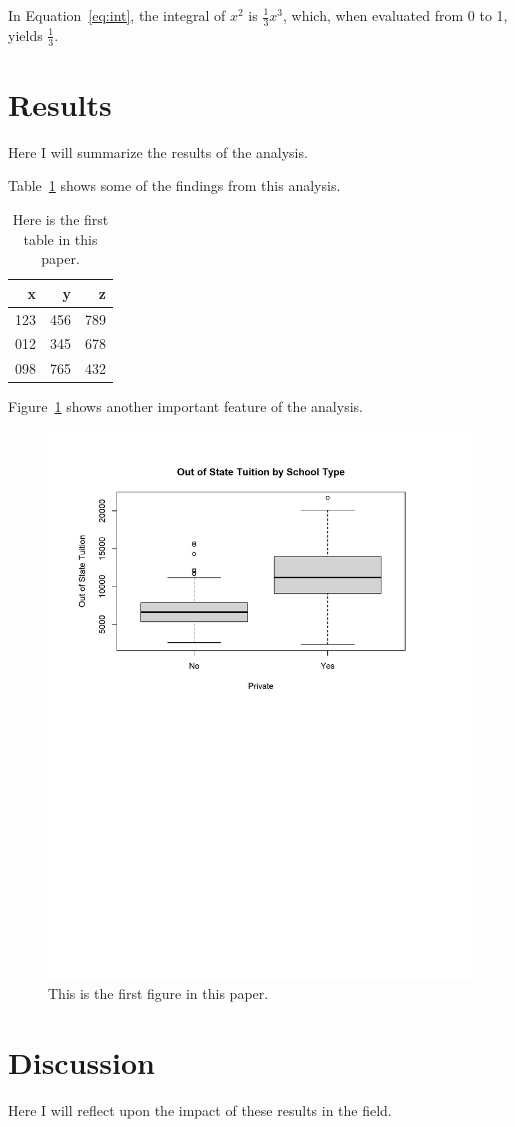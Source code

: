 \documentclass[12pt]{article}
\begin{document}
In Equation~\eqref{eq:int}, the integral of $x^2$ is $\frac{1}{3}x^3$, which, when evaluated from 0 to 1, yields $\frac{1}{3}$.

\section{Results}
\label{sec:resu}

Here I will summarize the results of the analysis.

\lipsum[3]

Table~\ref{tab:tabl} shows some of the findings from this analysis.

\begin{table}[tbp]
\caption{Here is the first table in this paper.}
\label{tab:tabl}
\centering
\begin{tabular}{rrr}
\toprule
x & y & z \\
\midrule
123 & 456 & 789 \\
012 & 345 & 678 \\
098 & 765 & 432 \\
\bottomrule
\end{tabular}
\end{table}

Figure~\ref{fig:figu} shows another important feature of the analysis.

\begin{figure}[tbp]
    \centering
    \includegraphics[width=\textwidth]{Practicing LaTeX Example Figure.pdf}
    \caption{This is the first figure in this paper.}
    \label{fig:figu}
\end{figure}

\section{Discussion}
\label{sec:disc}

Here I will reflect upon the impact of these results in the field. 

\lipsum[2]


\end{document}
